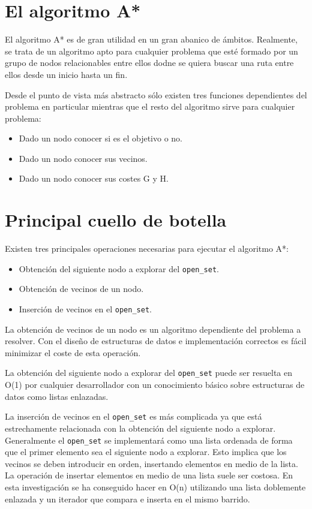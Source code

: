 
\section{El algoritmo A*}

El algoritmo A* es de gran utilidad en un gran abanico de ámbitos.
Realmente, se trata de un algoritmo apto para cualquier problema
que esté formado por un grupo de nodos relacionables entre ellos
dodne se quiera buscar una ruta entre ellos desde un inicio hasta
un fin.

Desde el punto de vista más abstracto sólo existen tres funciones
dependientes del problema en particular mientras que el resto
del algoritmo sirve para cualquier problema:

\begin{itemize}[itemsep=0.25px]
    \item Dado un nodo conocer si es el objetivo o no.
    \item Dado un nodo conocer sus vecinos.
    \item Dado un nodo conocer sus costes G y H.
\end{itemize}

\section{Principal cuello de botella}

Existen tres principales operaciones necesarias para
ejecutar el algoritmo A*:

\begin{itemize}[itemsep=0.25px]
    \item Obtención del siguiente nodo a explorar del \lstinline{open_set}.
    \item Obtención de vecinos de un nodo.
    \item Inserción de vecinos en el \lstinline{open_set}.
\end{itemize}

La obtención de vecinos de un nodo es un algoritmo dependiente del problema a resolver.
Con el diseño de estructuras de datos e implementación correctos es fácil
minimizar el coste de esta operación.

La obtención del siguiente nodo a explorar del \lstinline{open_set}
puede ser resuelta en O(1) por cualquier desarrollador con un conocimiento
básico sobre estructuras de datos como listas enlazadas.

La inserción de vecinos en el \lstinline{open_set} es más complicada
ya que está estrechamente relacionada con la obtención del siguiente nodo
a explorar.
Generalmente el \lstinline{open_set} se implementará como una lista ordenada
de forma que el primer elemento sea el siguiente nodo a explorar.
Esto implica que los vecinos se deben introducir en orden,
insertando elementos en medio de la lista.
La operación de insertar elementos en medio de una lista suele ser
costosa.
En esta investigación se ha conseguido hacer en O(n) utilizando
una lista doblemente enlazada y un iterador que compara e inserta
en el mismo barrido.

